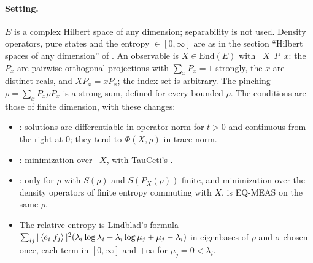 \documentclass[11pt]{article}
\begin{document}
\paragraph{Setting.} $E$ is a complex Hilbert space of any dimension; separability is not used.
Density operators, pure states and the entropy  $\in [0,\infty]$ are as
in the section ``Hilbert spaces of any dimension'' of
. An observable is $X \in \mathrm{End}(E)$ with
~$X$~$P$~$x$: the $P_x$ are pairwise orthogonal projections with
$\sum_x P_x = 1$ strongly, the $x$ are distinct reals, and $XP_x = xP_x$; the index set is
arbitrary. The pinching ~$\rho = \sum_x P_x\rho P_x$ is a
strong sum, defined for every bounded $\rho$. The conditions are those of finite dimension, with
these changes:
\begin{itemize}
\item {}: solutions are differentiable in operator norm for $t > 0$ and continuous from
  the right at $0$; they tend to $\Phi(X, \rho)$ in trace norm.
\item {}: minimization over ~$X$, with TauCeti's
  .
\item {}: only for $\rho$ with $S(\rho)$ and $S(P_X(\rho))$ finite, and minimization over
  the density operators of finite entropy commuting with $X$.  is EQ-MEAS on
  the same $\rho$.
\item The relative entropy  is Lindblad's formula
  $\sum_{ij}|\braket{e_i|f_j}|^2(\lambda_i\log\lambda_i - \lambda_i\log\mu_j + \mu_j - \lambda_i)$
  in eigenbases of $\rho$ and $\sigma$ chosen once, each term in $[0,\infty]$ and $+\infty$ for
  $\mu_j = 0 < \lambda_i$.
\end{itemize}
\end{document}
